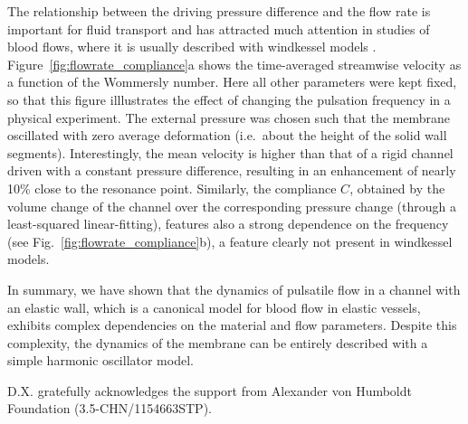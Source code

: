 \documentclass[aps,prl,reprint,superscriptaddress,floatfix]{revtex4-1}
\begin{document}
The relationship between the driving pressure difference and the flow rate is important for fluid transport and has attracted much attention in studies of blood flows, where it is usually described with windkessel models \citep{Westerhof2009}.  %
Figure~\ref{fig:flowrate_compliance}a shows the time-averaged streamwise velocity as a function of the Wommersly number. Here all other parameters were kept fixed, so that this figure illlustrates the effect of changing the pulsation frequency in a physical experiment. The external pressure was chosen such that the membrane oscillated with zero average deformation (i.e.\ about the height of the solid wall segments).  Interestingly, the mean velocity is higher than that of a rigid channel driven with a constant pressure difference, resulting in an enhancement of nearly 10\% close to the resonance point.
Similarly, the compliance $C$, obtained by the volume change of the channel over the corresponding pressure change (through a least-squared linear-fitting), features also a strong dependence on the frequency (see Fig.~\ref{fig:flowrate_compliance}b), a feature clearly not  present in windkessel models. %



In summary, we have shown that the dynamics of pulsatile flow in a channel with an elastic wall, which is a canonical model for blood flow in elastic vessels, exhibits complex dependencies on the material and flow parameters. Despite this complexity, the dynamics of the membrane can be entirely described with a simple harmonic oscillator model. 

\begin{acknowledgments}
D.X. gratefully acknowledges the support from Alexander von Humboldt Foundation (3.5-CHN/1154663STP).
\end{acknowledgments}
\end{document}
